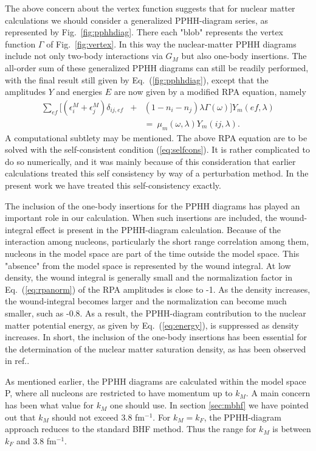 The above concern about the vertex function suggests that for nuclear
matter calculations we should
consider a generalized PPHH-diagram series, as represented by 
Fig.\ \ref{fig:pphhdiag}.
There each "blob" represents the vertex function $\Gamma$
of Fig.\ \ref{fig:vertex}. 
In this way the nuclear-matter PPHH diagrams include not only
two-body interactions
via $G_M$ but also one-body insertions.  The all-order sum of these 
generalized PPHH diagrams can still be readily performed, with the
final result  still given by Eq.\ (\ref{fig:pphhdiag}), except that
the amplitudes $Y$ and energies $E$ are now given by a modified RPA 
equation, namely
\begin{eqnarray}
   \sum_{ef}[(\epsilon^M _i  + \epsilon^M _j)\delta_{ij,ef}
   &+& (1-n_i-n_j)\lambda \Gamma(\omega) ]Y_m(ef,\lambda) \nonumber \\
   &&=\ \mu_m(\omega,\lambda)Y_m(ij,\lambda).
   \label{eq:rpa}
\end{eqnarray}
A computational subtlety may be mentioned. The above RPA equation 
are to be solved  with the self-consistent condition 
(\ref{eq:selfcons}). 
It is rather complicated to do so
numerically, and it was mainly because of this consideration that
earlier calculations \cite{shk87} treated this self consistency
by way of a perturbation method. In the present work we have 
treated this
self-consistency exactly.

The inclusion of the one-body insertions  for the PPHH diagrams
has played an important role in our calculation. When such insertions
are included,  the wound-integral effect is present in the PPHH-diagram
calculation. Because of the interaction among nucleons, particularly
the short range correlation among them, nucleons in the model space are
part of the time outside the model
space. This "absence" from the model space is represented by the wound
integral. At low density, the wound integral is generally small
and the normalization factor in Eq.\  (\ref{eq:rpanorm}) of the RPA 
amplitudes is close to -1.
As the density increases, the wound-integral  becomes larger
and the normalization can become much smaller, such as -0.8.
As a result, the PPHH-diagram contribution to the nuclear 
matter potential
energy, as given by Eq.\ (\ref{eq:energy}), is suppressed as 
density increases.
In short,
the inclusion of the one-body insertions has been essential  for the
determination of the nuclear matter saturation density, as has been
observed in ref.\cite{shk87}.
 
As mentioned earlier, the PPHH diagrams are calculated within the 
model space P, where all nucleons are restricted to have momentum 
up to $k_M$. A main concern has been what value for $k_M$ one should 
use. In section \ref{sec:mbhf} we have pointed out that $k_M$ should 
not exceed 3.8 fm$^{-1}$. For $k_M = k_F$, the PPHH-diagram approach 
reduces to the standard BHF method.
Thus the range for $k_M$ is between $k_F$ and 3.8 fm$^{-1}$. 


